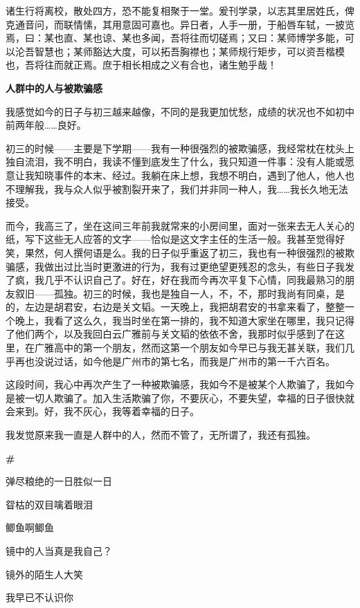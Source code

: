 \documentclass{ctexbook}
\begin{document}
    诸生行将离校，散处四方，恐不能复相聚于一堂。爰刊学录，以志其里居姓氏，俾克通音问，而联情愫，其用意固可嘉也。异日者，人手一册，于船唇车轼，一披览焉，曰：某也直、某也谅、某也多闻，吾将往而切磋焉；又曰：某师博学多能，可以沦吾智慧也；某师豁达大度，可以拓吾胸襟也；某师规行矩步，可以资吾楷模也，吾将往而就正焉。庶于相长相成之义有合也，诸生勉乎哉！

\newpage
\textbf{人群中的人与被欺骗感}


\mbox


    我感觉如今的日子与初三越来越像，不同的是我更加忧愁，成绩的状况也不如初中前两年般……良好。

    初三的时候——主要是下学期——我有一种很强烈的被欺骗感，我经常枕在枕头上独自流泪，我不明白，我读不懂到底发生了什么，我只知道一件事：没有人能或愿意让我知晓事件的本末、经过。我躺在床上想，我想不明白，遇到了他人，他人也不理解我，我与众人似乎被割裂开来了，我们并非同一种人，我……我长久地无法接受。

    而今，我高三了，坐在这间三年前我就常来的小房间里，面对一张来去无人关心的纸，写下这些无人应答的文字——恰似是这文字主任的生活一般。我甚至觉得好笑，果然，何人撰何语是么。我的日子似乎重返了初三，我也有一种很强烈的被欺骗感，我做出过比当时更激进的行为，我有过更绝望更残忍的念头，有些日子我发了疯，我几乎不认识自己了。好在，好在我而今再次平复下心情，同我最熟习的朋友叙旧——孤独。初三的时候，我也是独自一人，不，不，那时我尚有同桌，是的，左边是胡君安，右边是关文韬。一天晚上，我把胡君安的书拿来看了，整整一个晚上，我看了这么久，我当时坐在第一排的，我不知道大家坐在哪里，我只记得了他们两个，以及我回白云广雅前与关文韬的依依不舍，我那时似乎感到了在这里，在广雅高中的第一个朋友，然而这第一个朋友如今早已与我无甚关联，我们几乎再也没说过话，如今他是广州市的第七名，而我是广州市的第一千六百名。

    这段时间，我心中再次产生了一种被欺骗感，我如今不是被某个人欺骗了，我如今是被一切人欺骗了。加入生活欺骗了你，不要灰心，不要失望，幸福的日子很快就会来到。好，我不灰心，我等着幸福的日子。

    我发觉原来我一直是人群中的人，然而不管了，无所谓了，我还有孤独。

\newpage
\textbf{\#}


\mbox


    弹尽粮绝的一日胜似一日

    眢枯的双目噙着眼泪

    鲫鱼啊鲫鱼

    镜中的人当真是我自己？

    镜外的陌生人大笑

    我早已不认识你
\end{document}
